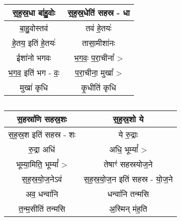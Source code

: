 {\centering
\begin{longtable}{|c|c|}
\hline
स॒ह॒स्र॒धा बा॑हु॒वोः                & स॒ह॒स्र॒धेति॑ सहस्र - धा\\
\hline
बा॒हु॒वोस्तव॑                     & तव॑ हे॒तयः॑\\
\hline
हे॒तय॒ इति॑ हे॒तयः॑                 & तासा॒मीशा॑नः\\
\hline
ईशा॑नो भगवः                   & भ॒ग॒वः॒ प॒रा॒चीना᳚ >\\
\hline
भ॒ग॒व॒ इति॑ भग - वः॒              & प॒रा॒चीना॒ मुखा᳚ >\\
\hline
मुखा॑ कृधि                      & कृ॒धीति॑ कृधि\\
\hline
\end{longtable}
}
\subsection{}
{\centering
\begin{longtable}{|c|c|}
\hline
स॒हस्रा॑णि सहस्र॒शः                & स॒ह॒स्र॒शो ये\\
\hline
स॒ह॒स्र॒श इति॑ सहस्र - शः           & ये रु॒द्राः\\
\hline
रु॒द्रा अधि॑                      & अधि॒ भूम्यां᳚ >\\
\hline
भूम्या॒मिति॒ भूम्यां᳚ >               & तेषाꣳ॑ सहस्रयोज॒ने\\
\hline
स॒ह॒स्र॒यो॒ज॒नेऽव॑                    & स॒ह॒स्र॒यो॒ज॒न इति॑ सहस्र - यो॒ज॒ने\\
\hline
अव॒ धन्वा॑नि                     & धन्वा॑नि तन्मसि\\
\hline
त॒न्म॒सीति॑ तन्मसि                 & अ॒स्मिन् म॑ह॒ति\\
\hline
\end{longtable}
}
